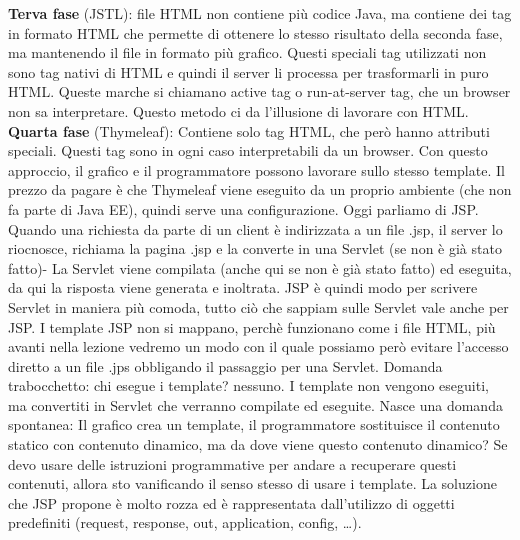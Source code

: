 \newline
\textbf{Terva fase} (JSTL): file HTML non contiene più codice Java, ma contiene dei tag in formato HTML che permette di ottenere lo stesso risultato della seconda fase, ma mantenendo il file in formato più grafico. Questi speciali tag utilizzati non sono tag nativi di HTML e quindi il server li processa per trasformarli in puro HTML. Queste marche si chiamano active tag o run-at-server tag, che un browser non sa interpretare. Questo metodo ci da l'illusione di lavorare con HTML.\newline
\newline
\textbf{Quarta fase} (Thymeleaf): Contiene solo tag HTML, che però hanno attributi speciali. Questi tag sono in ogni caso interpretabili da un browser. Con questo approccio, il grafico e il programmatore possono lavorare sullo stesso template. Il prezzo da pagare è che Thymeleaf viene eseguito da un proprio ambiente (che non fa parte di Java EE), quindi serve una configurazione.\newline
\newline
Oggi parliamo di JSP.\newline
\newline
Quando una richiesta da parte di un client è indirizzata a un file .jsp, il server lo riocnosce, richiama la pagina .jsp e la converte in una Servlet (se non è già stato fatto)- La Servlet viene compilata (anche qui se non è già stato fatto) ed eseguita, da qui la risposta viene generata e inoltrata.\newline
JSP è quindi modo per scrivere Servlet in maniera più comoda, tutto ciò che sappiam sulle Servlet vale anche per JSP.\newline
I template JSP non si mappano, perchè funzionano come i file HTML, più avanti nella lezione vedremo un modo con il quale possiamo però evitare l'accesso diretto a un file .jps obbligando il passaggio per una Servlet.\newline
\newline
Domanda trabocchetto: chi esegue i template? nessuno. I template non vengono eseguiti, ma convertiti in Servlet che verranno compilate ed eseguite.\newline
\newline
Nasce una domanda spontanea: Il grafico crea un template, il programmatore sostituisce il contenuto statico con contenuto dinamico, ma da dove viene questo contenuto dinamico? Se devo usare delle istruzioni programmative per andare a recuperare questi contenuti, allora sto vanificando il senso stesso di usare i template. La soluzione che JSP propone è molto rozza ed è rappresentata dall'utilizzo di oggetti predefiniti (request, response, out, application, config, \dots).\newline
